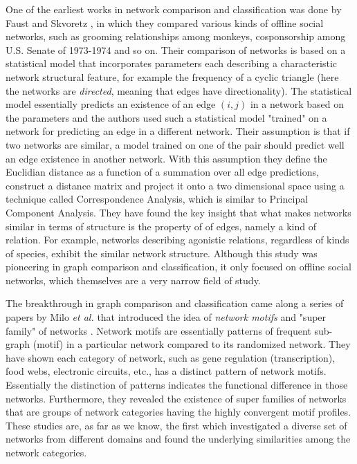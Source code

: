 \documentclass{article}
\begin{document}
	One of the earliest works in network comparison and classification was done by Faust and Skvoretz \cite{Faust.Skvoretz2002Comparing}, in which they compared various kinds of offline social networks, such as grooming relationships among monkeys, cosponsorship among U.S. Senate of 1973-1974 and so on. Their comparison of networks is based on a statistical model that incorporates parameters each describing a characteristic network structural feature, for example the frequency of a cyclic triangle (here the networks are \textit{directed}, meaning that edges have directionality). The statistical model essentially predicts an existence of an edge $(i,j)$ in a network based on the parameters and the authors used such a statistical model "trained" on a network for predicting an edge in a different network. Their assumption is that if two networks are similar, a model trained on one of the pair should predict well an edge existence in another network. With this assumption they define the Euclidian distance as a function of a summation over all edge predictions, construct a distance matrix and project it onto a two dimensional space using a technique called Correspondence Analysis, which is similar to Principal Component Analysis. They have found the key insight that what makes networks similar in terms of structure is the property of of edges, namely a kind of relation. For example, networks describing agonistic relations, regardless of kinds of species, exhibit the similar network structure. Although this study was pioneering in graph comparison and classification, it only focused on offline social networks, which themselves are a very narrow field of study.
	
	The breakthrough in graph comparison and classification came along a series of papers by Milo \textit{et al.} that introduced the idea of \textit{network motifs} and "super family" of networks \cite{Milo_motif, Milo_SuperFamily}. Network motifs are essentially patterns of frequent sub-graph (motif) in a particular network compared to its randomized network\cite{Milo_motif}. They have shown each category of network, such as gene regulation (transcription), food webs, electronic circuits, etc., has a distinct pattern of network motifs. Essentially the distinction of patterns indicates the functional difference in those networks. Furthermore, they revealed the existence of super families of networks that are groups of network categories having the highly convergent motif profiles. These studies are, as far as we know, the first which investigated a diverse set of networks from different domains and found the underlying similarities among the network categories.
	
\end{document}
